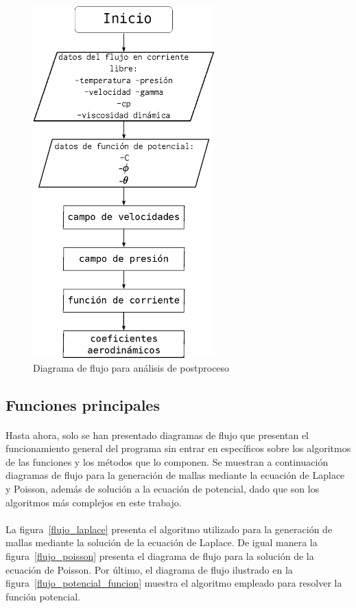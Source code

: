 \documentclass[letterpaper, openright, 12pt]{book}
\begin{document}
    \begin{figure}[htbp!]
        \centering
        \includegraphics[keepaspectratio, width=70mm]
            {./img/flujo_potencial_after}
        \caption{Diagrama de flujo para análisis de postproceso}
        \label{flujo_potencial_after}
    \end{figure}

    \subsection{Funciones principales}
    \paragraph*{}
        Hasta ahora, solo se han presentado diagramas de flujo que presentan
        el funcionamiento general del programa sin entrar en específicos
        sobre los algoritmos de las funciones y los métodos que lo componen.
        Se muestran a continuación diagramas de flujo para la generación de
        mallas mediante la ecuación de Laplace y Poisson, además de solución
        a la ecuación de potencial, dado que son los algoritmos más complejos
        en este trabajo.

    \paragraph*{}
        La figura~\ref{flujo_laplace} presenta el algoritmo utilizado para la
        generación de mallas mediante la solución de la ecuación de Laplace.
        De igual manera la figura~\ref{flujo_poisson} presenta el diagrama
        de flujo para la solución de la ecuación de Poisson. Por último, el
        diagrama de flujo ilustrado en la figura~\ref{flujo_potencial_funcion}
        muestra el algoritmo empleado para resolver la función potencial.
\end{document}

